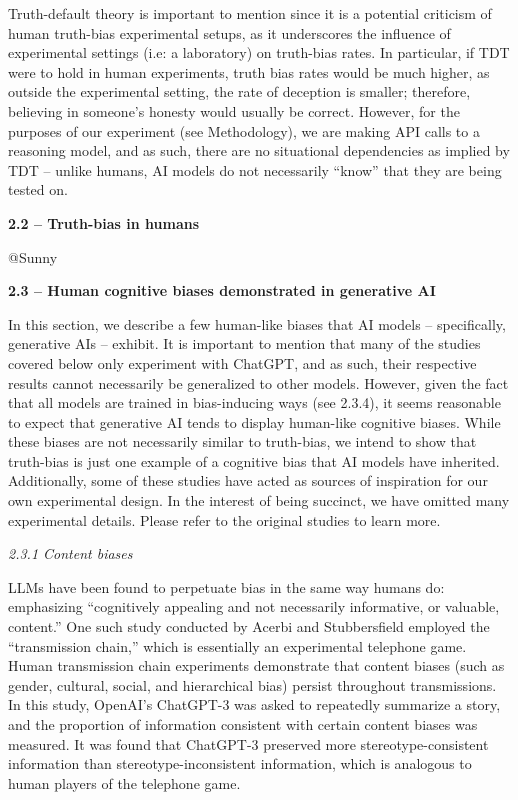 \documentclass{article}
\begin{document}
Truth-default theory is important to mention since it is a potential criticism of human truth-bias experimental setups, as it underscores the influence of experimental settings (i.e: a laboratory) on truth-bias rates. In particular, if TDT were to hold in human experiments, truth bias rates would be much higher, as outside the experimental setting, the rate of deception is smaller; therefore, believing in someone's honesty would usually be correct.\citep{levine_truth-default_2014} However, for the purposes of our experiment (see Methodology), we are making API calls to a reasoning model, and as such, there are no situational dependencies as implied by TDT – unlike humans, AI models do not necessarily “know” that they are being tested on. \newline

\textbf{2.2 – Truth-bias in humans}

@Sunny

\textbf{2.3 – Human cognitive biases demonstrated in generative AI}

In this section, we describe a few human-like biases that AI models – specifically, generative AIs – exhibit. It is important to mention that many of the studies covered below only experiment with ChatGPT, and as such, their respective results cannot necessarily be generalized to other models. However, given the fact that all models are trained in bias-inducing ways (see 2.3.4), it seems reasonable to expect that generative AI tends to display human-like cognitive biases. While these biases are not necessarily similar to truth-bias, we intend to show that truth-bias is just one example of a cognitive bias that AI models have inherited. Additionally, some of these studies have acted as sources of inspiration for our own experimental design. In the interest of being succinct, we have omitted many experimental details. Please refer to the original studies to learn more.

\textit{2.3.1 Content biases}

LLMs have been found to perpetuate bias in the same way humans do: emphasizing “cognitively appealing and not necessarily informative, or valuable, content.” One such study conducted by Acerbi and Stubbersfield employed the “transmission chain,” which is essentially an experimental telephone game. Human transmission chain experiments demonstrate that content biases (such as gender, cultural, social, and hierarchical bias) persist throughout transmissions. \citep{mesoudi_multiple_2008} In this study, OpenAI’s ChatGPT-3 was asked to repeatedly summarize a story, and the proportion of information consistent with certain content biases was measured. It was found that ChatGPT-3 preserved more stereotype-consistent information than stereotype-inconsistent information, which is analogous to human players of the telephone game. \citep{acerbi_large_2023}
\end{document}
